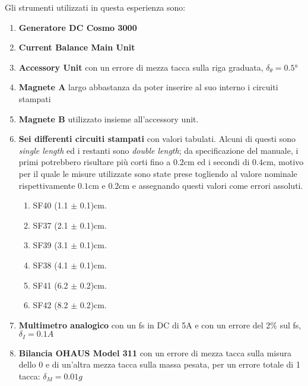 {\fontsize{11}{14}\selectfont 
Gli strumenti utilizzati in questa esperienza sono:
\begin{enumerate}
    \item \textbf{Generatore DC Cosmo 3000}
    \item \textbf{Current Balance Main Unit}
    \item \textbf{Accessory Unit} con un errore di mezza tacca sulla riga graduata, $\delta_{\theta} = 0.5$°
    \item \textbf{Magnete A} largo abbastanza da poter inserire al suo interno i circuiti stampati 
    \item \textbf{Magnete B} utilizzato insieme all'accessory unit.
    \item \textbf{Sei differenti circuiti stampati} con valori tabulati. Alcuni di questi sono \emph{single length} ed i restanti sono \emph{double length}; da specificazione del manuale, i primi potrebbero risultare più corti fino a $0.2$cm ed i secondi di $0.4$cm, motivo per il quale le misure utilizzate sono state prese togliendo al valore nominale rispettivamente $0.1$cm e $0.2$cm e assegnando questi valori come errori assoluti.
    \begin{enumerate}
        \item {SF40 (1.1 $\pm$ 0.1)cm}.
        \item {SF37 (2.1 $\pm$ 0.1)cm}.
        \item {SF39 (3.1 $\pm$ 0.1)cm}.
        \item {SF38 (4.1 $\pm$ 0.1)cm}.
        \item {SF41 (6.2 $\pm$ 0.2)cm}.
        \item {SF42 (8.2 $\pm$ 0.2)cm}.
    \end{enumerate}
    \item \textbf{Multimetro analogico} con un fs in DC di 5A e con un errore del 2\% sul fs, $\delta_{I} = 0.1A$
    \item \textbf{Bilancia OHAUS Model 311} con un errore di mezza tacca sulla misura dello 0 e di un'altra mezza tacca sulla massa pesata, per un errore totale di 1 tacca: $\delta_{M} = 0.01g$
\end{enumerate}

\par}